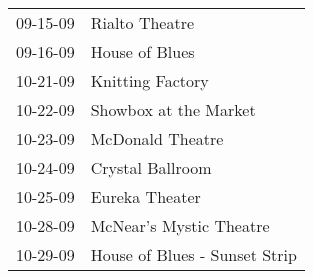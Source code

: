 \begin{supertabular}{p{0.25\columnwidth}p{0.75\columnwidth}}
 09-15-09 &                 Rialto Theatre \\
 09-16-09 &                 House of Blues \\
 10-21-09 &               Knitting Factory \\
 10-22-09 &          Showbox at the Market \\
 10-23-09 &               McDonald Theatre \\
 10-24-09 &               Crystal Ballroom \\
 10-25-09 &                 Eureka Theater \\
 10-28-09 &        McNear's Mystic Theatre \\
 10-29-09 &  House of Blues - Sunset Strip \\
\end{supertabular}
